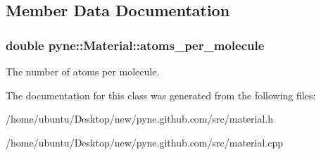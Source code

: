 \subsection{Member Data Documentation}
\subsubsection[{\texorpdfstring{atoms\+\_\+per\+\_\+molecule}{atoms_per_molecule}}]{\setlength{\rightskip}{0pt plus 5cm}double pyne\+::\+Material\+::atoms\+\_\+per\+\_\+molecule}\hypertarget{classpyne_1_1_material_a7ddff1aaebc94bcda22d3422c093a756}{}\label{classpyne_1_1_material_a7ddff1aaebc94bcda22d3422c093a756}
The number of atoms per molecule. 

The documentation for this class was generated from the following files\+:\begin{DoxyCompactItemize}
\item 
/home/ubuntu/\+Desktop/new/pyne.\+github.\+com/src/material.\+h\item 
/home/ubuntu/\+Desktop/new/pyne.\+github.\+com/src/material.\+cpp\end{DoxyCompactItemize}
